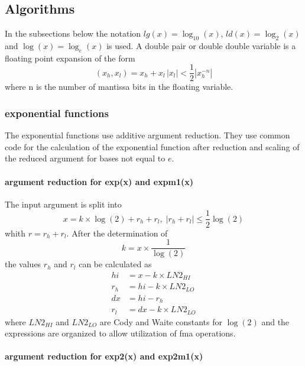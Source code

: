 \documentclass[10pt,a4paper,final,oneside]{article}
\numberwithin{equation}{subsection}
\begin{document}
\subsection{Algorithms}
In the subsections below the notation $ lg(x) = \log_{10}(x)$,
$ ld(x) = \log_2{(x)} $ and $ \log{(x)} = \log_e{(x)} $ is used. A double pair
or double double variable is a floating point expansion of the form
\[
    (x_h, x_l) = x_h + x_l \, |x_l| < \frac{1}{2} |x_h^{-n}|
\]
where n is the number of mantissa bits in the floating variable.
\subsubsection{exponential functions}
\label{sub_sec:expxxx}

The exponential functions use additive argument reduction.
They use common code for the calculation of the exponential function
after reduction and scaling of the reduced argument for bases not
equal to $e$.

\paragraph{argument reduction for exp(x) and expm1(x)}

    The input argument is split into
    \begin{equation}
        x = k \times \log{(2)} + r_h + r_l, \;
        |r_h +r_l| \le \frac{1}{2} \log{(2)}
    \end{equation}
    whith $r = r_h + r_l$.
    After the determination of
    \[
        k = x \times \frac{1}{\log{(2)}}
    \]
    the values $r_h$ and $r_l$ can be calculated as
    \[
       \begin{aligned}
       hi &= x - k \times LN2_{HI} \\
       r_h &= hi - k \times LN2_{LO} \\
       dx & = hi - r_h \\
       r_l &= dx - k \times LN2_{LO}
       \end{aligned}
    \]
    where $LN2_{HI}$ and $LN2_{LO}$ are Cody and Waite constants for $\log(2)$
    and the expressions are organized to allow utilization of fma operations.

\paragraph{argument reduction for exp2(x) and exp2m1(x)}
\end{document}
